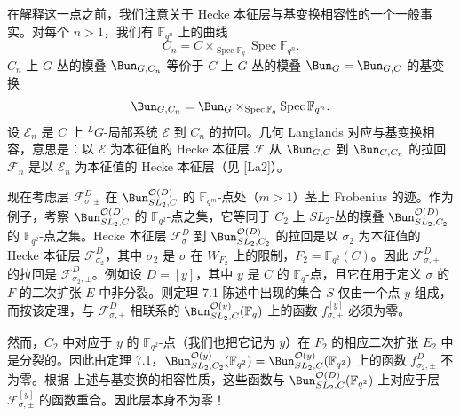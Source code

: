 在解释这一点之前，我们注意关于 Hecke 本征层与基变换相容性的一个一般事实。对每个 $n > 1$，我们有 $\mathbb{F}_{q^n}$ 上的曲线
\[
C_n = C\times_{\operatorname{Spec}\mathbb{F}_q}\operatorname{Spec}\mathbb{F}_{q^n}.
\]
$C_n$ 上 $G$-丛的模叠 $\Bun_{G,C_n}$ 等价于 $C$ 上 $G$-丛的模叠 $\Bun_G = \Bun_{G,C}$ 的基变换
\[
\Bun_{G,C_n} = \Bun_G\times_{\operatorname{Spec}\mathbb{F}_q}\operatorname{Spec}\mathbb{F}_{q^n}.
\]
设 $\mathcal{E}_n$ 是 $C$ 上 ${}^{L}G$-局部系统 $\mathcal{E}$ 到 $C_n$ 的拉回。几何 Langlands 对应与基变换相容，意思是：以 $\mathcal{E}$ 为本征值的 Hecke 本征层 $\mathcal{F}$ 从 $\Bun_{G,C}$ 到 $\Bun_{G,C_n}$ 的拉回 $\mathcal{F}_n$ 是以 $\mathcal{E}_n$ 为本征值的 Hecke 本征层（见 [La2]）。

现在考虑层 $\mathcal{F}^D_{\sigma,\pm}$ 在 $\Bun^{\mathcal{O}(D)}_{SL_2,C}$ 的 $\mathbb{F}_{q^m}$-点处（$m > 1$）茎上 Frobenius 的迹。作为例子，考察 $\Bun^{\mathcal{O}(D)}_{SL_2,C}$ 的 $\mathbb{F}_{q^2}$-点之集，它等同于 $C_2$ 上 $SL_2$-丛的模叠 $\Bun^{\mathcal{O}(D)}_{SL_2,C_2}$ 的 $\mathbb{F}_{q^2}$-点之集。Hecke 本征层 $\mathcal{F}^D_\sigma$ 到 $\Bun^{\mathcal{O}(D)}_{SL_2,C_2}$ 的拉回是以 $\sigma_2$ 为本征值的 Hecke 本征层 $\mathcal{F}^D_{\sigma_2}$，其中 $\sigma_2$ 是 $\sigma$ 在 $W_{F_2}$ 上的限制，$F_2 = \mathbb{F}_{q^2}(C)$。因此 $\mathcal{F}^D_{\sigma,\pm}$ 的拉回是 $\mathcal{F}^D_{\sigma_2,\pm}$。例如设 $D = [y]$，其中 $y$ 是 $C$ 的 $\mathbb{F}_q$-点，且它在用于定义 $\sigma$ 的 $F$ 的二次扩张 $E$ 中非分裂。则定理 7.1 陈述中出现的集合 $S$ 仅由一个点 $y$ 组成，而按该定理，与 $\mathcal{F}^D_{\sigma,\pm}$ 相联系的 $\Bun^{\mathcal{O}(y)}_{SL_2,C}(\mathbb{F}_q)$ 上的函数 $f^{[y]}_{\sigma,\pm}$ 必须为零。


然而，$C_2$ 中对应于 $y$ 的 $\mathbb{F}_{q^2}$-点（我们也把它记为 $y$）在 $F_2$ 的相应二次扩张 $E_2$ 中是分裂的。因此由定理 7.1，$\Bun^{\mathcal{O}(y)}_{SL_2,C_2}(\mathbb{F}_{q^2}) = \Bun^{\mathcal{O}(y)}_{SL_2,C}(\mathbb{F}_{q^2})$ 上的函数 $f^D_{\sigma_2,\pm}$ 不为零。根据
上述与基变换的相容性质，这些函数与 $\Bun^{\mathcal{O}(D)}_{SL_2,C}(\mathbb{F}_{q^2})$ 上对应于层 $\mathcal{F}^{[y]}_{\sigma,\pm}$ 的函数重合。因此层本身不为零！


